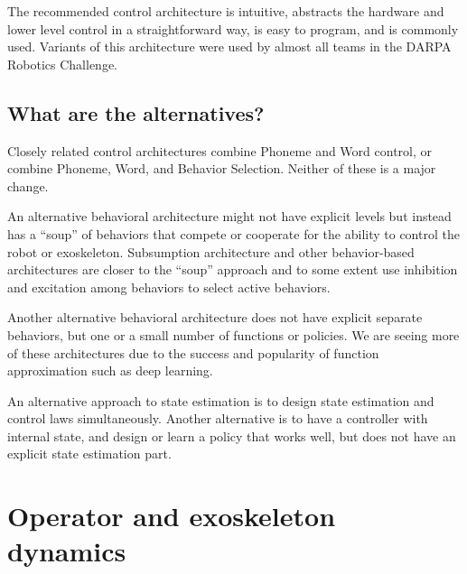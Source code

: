 \documentclass[letterpaper,12pt,fullpage]{article}
\begin{document}
The recommended control architecture is intuitive, abstracts the hardware 
and lower level control in a straightforward way, is easy to program, and is
commonly used. Variants of this architecture were used by almost all teams
in the DARPA Robotics Challenge.

\subsection{What are the alternatives?}

Closely related control architectures combine Phoneme and Word control,
or combine Phoneme, Word, and Behavior Selection.
Neither of these is a major change.

An alternative behavioral architecture might not have explicit levels but instead
has a ``soup'' of behaviors that compete or cooperate for the ability to
control the robot or exoskeleton. Subsumption architecture and other behavior-based
architectures are closer to the ``soup'' approach and to some extent
use inhibition and excitation
among behaviors to select active behaviors.

Another alternative behavioral architecture does not have explicit separate behaviors,
but one or a small number of functions or policies. 
We are seeing more of these architectures
due to the success and popularity of function approximation such as
deep learning.

An alternative approach to state estimation is to design state estimation
and control laws simultaneously.
Another alternative is
to have a controller with internal state, and design or learn a policy
that works well, but does not have an explicit state estimation 
part.

\section{Operator and exoskeleton dynamics}
\end{document}
